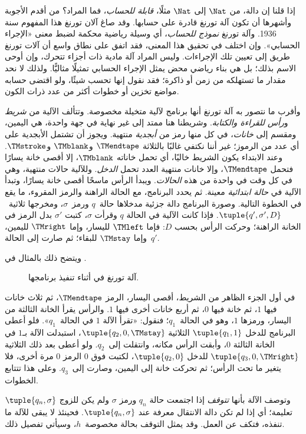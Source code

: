 \documentclass[../../../include/open-logic-section]{subfiles}
\begin{document}

إذا قلنا إن دالة، من $\Nat$ إلى $\Nat$ مثلًا، \emph{قابلة للحساب}، فما المراد؟ من أقدم الأجوبة وأشهرها أن تكون آلة تورنغ قادرة على حسابها. وقد صاغ آلان تورنغ هذا المفهوم سنة 1936. وآلة تورنغ \emph{نموذج للحساب}، أي وسيلة رياضية محكمة لضبط معنى «الإجراء الحسابي». وإن اختلف في تحقيق هذا المعنى، فقد اتفق على نطاق واسع أن آلات تورنغ طريق إلى تعيين تلك الإجراءات. وليس المراد آلة مادية ذات أجزاء تتحرك، وإن أوحى الاسم بذلك؛ بل هي بناء رياضي محض يمثل الإجراء الحسابي تمثيلًا مثاليًّا. ولذلك لا نحد مقدار ما تستهلكه من زمن أو ذاكرة؛ فقد نقول إنها تحسب شيئًا، ولو اقتضى حسابه مواضع تخزين أو خطوات أكثر من عدد ذرات الكون.

\begin{explain}
وأقرب ما نتصور به آلة تورنغ أنها برنامج لآلية متخيلة مخصوصة. وتتألف الآلية من \emph{شريط} و\emph{رأس للقراءة والكتابة}. وشريطنا هنا ممتد إلى غير نهاية في جهة واحدة، هي اليمين، ومقسم إلى \emph{خانات}، في كل منها رمز من \emph{أبجدية} منتهية. ويجوز أن تشتمل الأبجدية على أي عدد من الرموز؛ غير أننا نكتفي غالبًا بالثلاثة $\TMendtape$ و$\TMblank$ و$\TMstroke$. وعند الابتداء يكون الشريط خاليًا، أي تحمل خاناته $\TMblank$، إلا أقصى خانة يسارًا فتحمل $\TMendtape$، وإلا خانات منتهية العدد تحمل \emph{الدخل}. وللآلية حالات منتهية، وهي في كل وقت في واحدة من هذه \emph{الحالات}. ويبدأ الرأس ماسحًا أقصى خانة يسارًا، وتبدأ الآلية في \emph{حالة ابتدائية} معينة. ثم يحدد البرنامج، مع الحالة الراهنة والرمز المقروء، ما يقع في الخطوة التالية. وصورة البرنامج دالة جزئية مدخلاها حالة~$q$ ورمز~$\sigma$، ومخرجها ثلاثية~$\tuple{q',
  \sigma',D}$. فإذا كانت الآلية في الحالة $q$ وقرأت $\sigma$، كتبت $\sigma'$ بدل الرمز في الخانة الراهنة؛ وحركت الرأس بحسب $D$: فإما $\TMleft$ لليسار، وإما $\TMright$ لليمين، وإما $\TMstay$ للبقاء؛ ثم صارت إلى الحالة~$q'$.

ويتضح ذلك بالمثال في .
\begin{figure}
  \caption{آلة تورنغ في أثناء تنفيذ برنامجها.}
\end{figure}
في أول الجزء الظاهر من الشريط، أقصى اليسار، الرمز $\TMendtape$، ثم ثلاث خانات فيها $1$، ثم خانة فيها $0$، ثم أربع خانات أخرى فيها $1$. والرأس يقرأ الخانة الثالثة من اليسار، ورمزها $1$، وهو في الحالة~$q_1$؛ فنقول: «تقرأ الآلة $1$ في الحالة~$q_1$». فلو أعطى البرنامج للدخل $\tuple{q_1,1}$ الثلاثية $\tuple{q_2,0,\TMstay}$، استبدلت الآلة بـ$1$ في الخانة الثالثة $0$، وأبقت الرأس مكانه، وانتقلت إلى~$q_2$. ولو أعطى بعد ذلك الثلاثية $\tuple{q_3,0,\TMright}$ للدخل $\tuple{q_2,0}$، لكتبت فوق $0$ الرمز $0$ مرة أخرى، فلا يتغير ما تحت الرأس؛ ثم تحركت خانة إلى اليمين، وصارت إلى~$q_3$. وعلى هذا تتتابع الخطوات.

وتوصف الآلة بأنها \emph{تتوقف} إذا اجتمعت حالة $q_n$ ورمز $\sigma$ ولم يكن للزوج $\tuple{q_n,\sigma}$ تعليمة؛ أي إذا لم تكن دالة الانتقال معرفة عند $\tuple{q_n,\sigma}$. فحينئذ لا يبقى للآلة ما تنفذه، فتكف عن العمل. وقد يمثل التوقف بحالة مخصوصة~$h$، وسيأتي تفصيل ذلك.
\end{explain}
\end{document}
